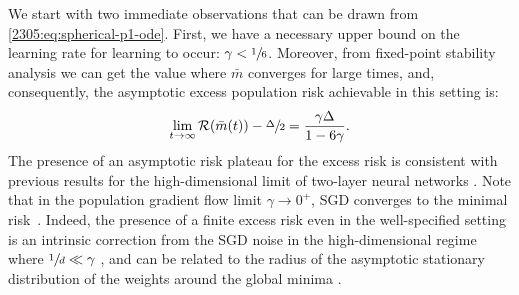 We start with two immediate observations that can be drawn from \eqref{2305:eq:spherical-p1-ode}. First, we have a necessary upper bound on the learning rate for learning to occur: \(\gamma < \sfrac{1}{6}\). Moreover, from fixed-point stability analysis we can get the value where \(\bar{m}\) converges for large times, and, consequently, the asymptotic excess population risk achievable in this setting is:
\begin{equation}
  \lim_{t\to\infty}\mathcal{R}(\bar{m}(t))-\sfrac{\Delta}{2} = \frac{\gamma\Delta}{1-6\gamma}.
\end{equation}
The presence of an asymptotic risk plateau for the excess risk is consistent with previous results for the high-dimensional limit of two-layer neural networks \citep{saad1996dynamics,goldt2019dynamics}. Note that in the population gradient flow limit $\gamma\to 0^{+}$, SGD converges to the minimal risk~\cite{robbins1951stochastic}. Indeed, the presence of a finite excess risk even in the well-specified setting is an intrinsic correction from the SGD noise in the high-dimensional regime where $\sfrac{1}{d}\ll \gamma$ \citep{veiga2022phase}, and can be related to the radius of the asymptotic stationary distribution of the weights around the global minima \citep{pflug1986stochastic,dieuleveut2020bridging}.


